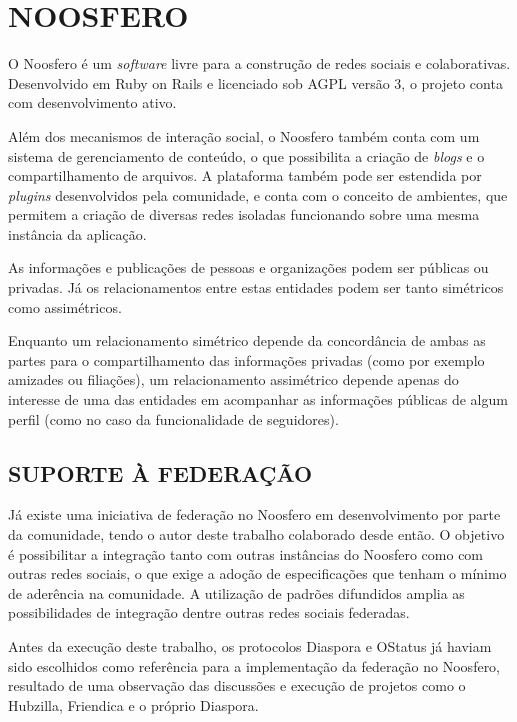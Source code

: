 \chapter{NOOSFERO}
\label{chapter:3}

O Noosfero é um \textit{software} livre para a construção de redes sociais e
colaborativas. Desenvolvido em Ruby on Rails e licenciado sob AGPL versão 3, o
projeto conta com desenvolvimento ativo.

Além dos mecanismos de interação social, o Noosfero também conta com um sistema de
gerenciamento de conteúdo, o que possibilita a criação de \textit{blogs} e o
compartilhamento de arquivos. A plataforma também pode ser estendida por
\textit{plugins} desenvolvidos pela comunidade, e conta com o conceito de ambientes,
que permitem a criação de diversas redes isoladas funcionando sobre uma mesma
instância da aplicação.

As informações e publicações de pessoas e organizações podem ser públicas ou
privadas. Já os relacionamentos entre estas entidades podem ser tanto simétricos
como assimétricos.

Enquanto um relacionamento simétrico depende da concordância de ambas as partes para
o compartilhamento das informações privadas (como por exemplo amizades ou
filiações), um relacionamento assimétrico depende apenas do interesse de uma das
entidades em acompanhar as informações públicas de algum perfil (como no caso da
funcionalidade de seguidores).



\section{SUPORTE À FEDERAÇÃO}

Já existe uma iniciativa de federação no Noosfero em desenvolvimento por parte da
comunidade, tendo o autor deste trabalho colaborado desde então. O objetivo é
possibilitar a integração tanto com outras instâncias do Noosfero como com outras
redes sociais, o que exige a adoção de especificações que tenham o mínimo de
aderência na comunidade. A utilização de padrões difundidos amplia as possibilidades
de integração dentre outras redes sociais federadas.

Antes da execução deste trabalho, os protocolos Diaspora e OStatus já haviam sido
escolhidos como referência para a implementação da federação no Noosfero, resultado
de uma observação das discussões e execução de projetos como o Hubzilla, Friendica e
o próprio Diaspora.

